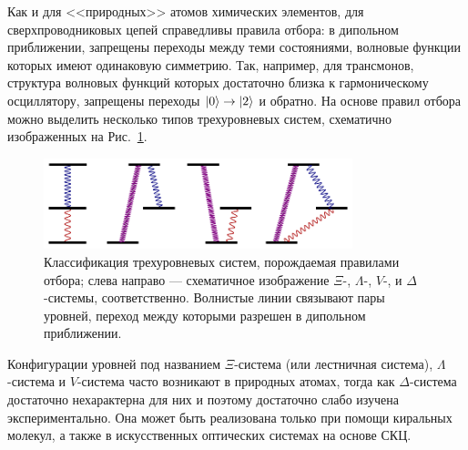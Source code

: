 Как и для <<природных>> атомов химических элементов, для сверхпроводниковых цепей справедливы правила отбора: в дипольном приближении, запрещены переходы между теми состояниями, волновые функции которых имеют одинаковую симметрию. Так, например, для трансмонов, структура волновых функций которых достаточно близка к гармоническому осциллятору, запрещены переходы $\ket{0}\rightarrow\ket{2}$ и обратно. На основе правил отбора можно выделить несколько типов трехуровневых систем, схематично изображенных на Рис.~\ref{fig: 3LS_class}.  
\begin{figure}[th]
	\centering
	\includegraphics[width=0.8\textwidth]{images/3Ls_V_Lbd_ladder.pdf}
	\caption[Классификация трехуровневых систем по разрешенности переходов.]{Классификация трехуровневых систем, порождаемая правилами отбора; слева направо --- схематичное изображение $\Xi$-, $\Lambda$-, $V$-, и $\Delta$-системы, соответственно. Волнистые линии связывают пары уровней, переход между которыми разрешен в дипольном приближении.}
	\label{fig: 3LS_class}
\end{figure}
Конфигурации уровней под названием $\Xi$-система (или лестничная система), $\Lambda$-система и $V$-система часто возникают в природных атомах, тогда как $\Delta$-система достаточно нехарактерна для них и поэтому достаточно слабо изучена экспериментально. Она может быть реализована только при помощи киральных молекул, а также в искусственных оптических системах на основе СКЦ. 

